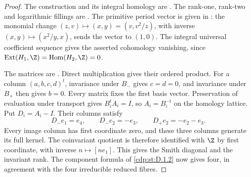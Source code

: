 \begin{proof}
The construction and its integral homology are
\citet[Theorems~1.1 and~3.1, pp.~2 and~8]{Wang2026}.
The rank-one, rank-two and logarithmic fillings are
\citet[Propositions~2.7, 2.8 and~2.10, pp.~4, 6 and~7]{Wang2026}.
The primitive period vector is given in
\citet[Lemma~2.6, p.~4]{Wang2026}: the monomial change
$(z,v)\mapsto(x,y)=(v,v^2/z)$, with inverse
$(x,y)\mapsto(x^2/y,x)$, sends the vector to $(1,0)$.
The integral universal coefficient sequence gives the asserted
cohomology vanishing, since
$\operatorname{Ext}(H_1,\Z)=\operatorname{Hom}(H_2,\Z)=0$.

The matrices are \citet[Proposition~4.4, equation~(20), p.~11]{Wang2026}.
Direct multiplication gives their ordered product. For a column
$(a,b,c,d)^t$, invariance under $B_-$ gives $c=d=0$, and invariance
under $B_+$ then gives $b=0$. Every matrix fixes the first basis
vector. Preservation of evaluation under transport gives
$B_i^tA_i=I$, so $A_i=B_i^{-t}$ on the homology lattice.
Put $D_i=A_i-I$. Their columns satisfy
\[
D_-e_1=e_4,\qquad D_-e_2=-e_3,\qquad
D_+e_2=-e_2-e_3.
\]
Every image column has first coordinate zero, and these three
columns generate its full kernel. The coinvariant quotient is
therefore identified with $\Z$ by first coordinate, with inverse
$n\mapsto[ne_1]$. This gives the Smith diagonal and the invariant
rank. The component formula of \cref{cdp:st:D.1.2} now gives four,
in agreement with the four irreducible reduced fibres.
\end{proof}